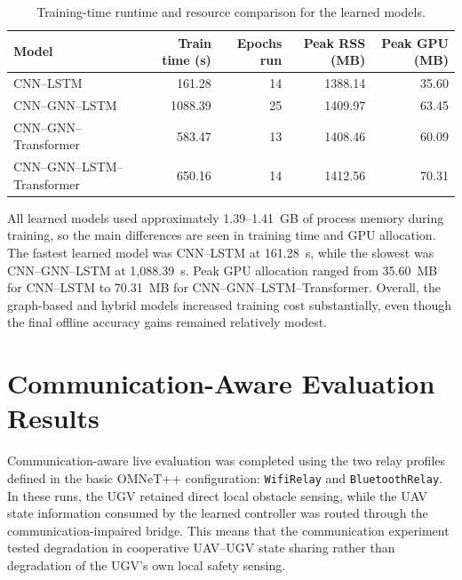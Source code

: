 \begin{table}[tbp]
    \caption{Training-time runtime and resource comparison for the learned models.}
    \label{tab:training_resource_comparison}
    \centering
    \scriptsize
    \setlength{\tabcolsep}{3pt}
    \renewcommand{\arraystretch}{1.10}
    \begin{tabular}{@{}lrrrr@{}}
        \toprule
        \textbf{Model} & \textbf{Train time (s)} & \textbf{Epochs run} & \textbf{Peak RSS (MB)} & \textbf{Peak GPU (MB)} \\
        \midrule
        CNN--LSTM & 161.28 & 14 & 1388.14 & 35.60 \\
        CNN--GNN--LSTM & 1088.39 & 25 & 1409.97 & 63.45 \\
        CNN--GNN--Transformer & 583.47 & 13 & 1408.46 & 60.09 \\
        CNN--GNN--LSTM--Transformer & 650.16 & 14 & 1412.56 & 70.31 \\
        \bottomrule
    \end{tabular}
\end{table}

All learned models used approximately 1.39--1.41~GB of process memory during training, so the main differences are seen in training time and GPU allocation. The fastest learned model was CNN--LSTM at 161.28~s, while the slowest was CNN--GNN--LSTM at 1,088.39~s. Peak GPU allocation ranged from 35.60~MB for CNN--LSTM to 70.31~MB for CNN--GNN--LSTM--Transformer. Overall, the graph-based and hybrid models increased training cost substantially, even though the final offline accuracy gains remained relatively modest.

\section{Communication-Aware Evaluation Results}

Communication-aware live evaluation was completed using the two relay profiles defined in the basic OMNeT++ configuration: \texttt{WifiRelay} and \texttt{BluetoothRelay}. In these runs, the UGV retained direct local obstacle sensing, while the UAV state information consumed by the learned controller was routed through the communication-impaired bridge. This means that the communication experiment tested degradation in cooperative UAV--UGV state sharing rather than degradation of the UGV's own local safety sensing.

